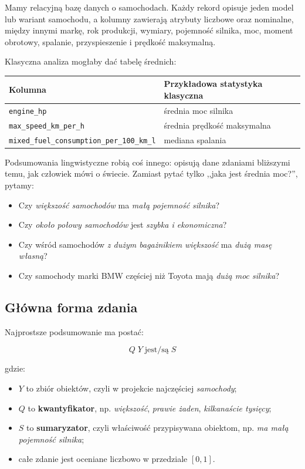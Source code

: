 \documentclass[11pt,a4paper]{article}
\newcommand{\code}[1]{\texttt{#1}}
\newcommand{\term}[1]{\textbf{#1}}
\begin{document}
Mamy relacyjną bazę danych o samochodach. Każdy rekord opisuje jeden model lub wariant samochodu, a kolumny zawierają atrybuty liczbowe oraz nominalne, między innymi markę, rok produkcji, wymiary, pojemność silnika, moc, moment obrotowy, spalanie, przyspieszenie i prędkość maksymalną.

Klasyczna analiza mogłaby dać tabelę średnich:

\begin{center}
\begin{tabular}{ll}
\toprule
Kolumna & Przykładowa statystyka klasyczna\\
\midrule
\code{engine\_hp} & średnia moc silnika\\
\code{max\_speed\_km\_per\_h} & średnia prędkość maksymalna\\
\code{mixed\_fuel\_consumption\_per\_100\_km\_l} & mediana spalania\\
\bottomrule
\end{tabular}
\end{center}

Podsumowania lingwistyczne robią coś innego: opisują dane zdaniami bliższymi temu, jak człowiek mówi o świecie. Zamiast pytać tylko ,,jaka jest średnia moc?'', pytamy:

\begin{itemize}
    \item Czy \emph{większość samochodów} ma \emph{małą pojemność silnika}?
    \item Czy \emph{około połowy samochodów} jest \emph{szybka i ekonomiczna}?
    \item Czy wśród samochodów \emph{z dużym bagażnikiem} \emph{większość} ma \emph{dużą masę własną}?
    \item Czy samochody marki BMW częściej niż Toyota mają \emph{dużą moc silnika}?
\end{itemize}

\subsection{Główna forma zdania}

Najprostsze podsumowanie ma postać:

\[
Q\;Y\;\text{jest/są}\;S
\]

gdzie:

\begin{itemize}
    \item \(Y\) to zbiór obiektów, czyli w projekcie najczęściej \emph{samochody};
    \item \(Q\) to \term{kwantyfikator}, np. \emph{większość}, \emph{prawie żaden}, \emph{kilkanaście tysięcy};
    \item \(S\) to \term{sumaryzator}, czyli właściwość przypisywana obiektom, np. \emph{ma małą pojemność silnika};
    \item całe zdanie jest oceniane liczbowo w przedziale \([0,1]\).
\end{itemize}
\end{document}
